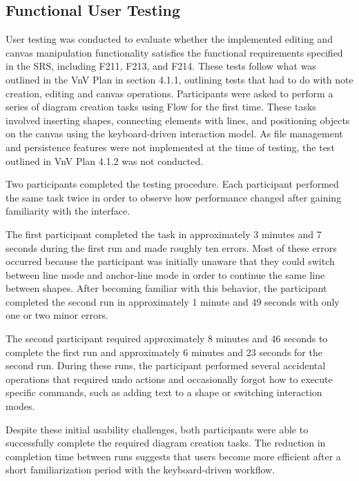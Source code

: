 \documentclass[12pt, titlepage]{article}
\begin{document}
\subsection{Functional User Testing}
User testing was conducted to evaluate whether the implemented editing and
canvas manipulation functionality satisfies the functional requirements
specified in the SRS, including F211, F213, and F214. These tests follow 
what was outlined in the VnV Plan 
in section 4.1.1, outlining tests that had to do with note creation, editing
and canvas operations. Participants were asked to perform a series of diagram
creation tasks using Flow for the first time. These tasks involved inserting
shapes, connecting elements with lines, and positioning objects on the
canvas using the keyboard-driven interaction model. As file management and
persistence features were not implemented at the time of testing, the test 
outlined in VnV Plan 4.1.2 was not conducted. 

\vspace{1em}

Two participants completed the testing procedure. Each participant performed
the same task twice in order to observe how performance changed after gaining
familiarity with the interface.

\vspace{1em}

The first participant completed the task in approximately 3 minutes and
7 seconds during the first run and made roughly ten errors. Most of these
errors occurred because the participant was initially unaware that they could
switch between line mode and anchor-line mode in order to continue the same
line between shapes. After becoming familiar with this behavior, the
participant completed the second run in approximately 1 minute and 49 seconds
with only one or two minor errors.

\vspace{1em}

The second participant required approximately 8 minutes and 46 seconds to
complete the first run and approximately 6 minutes and 23 seconds for the
second run. During these runs, the participant performed several accidental
operations that required undo actions and occasionally forgot how to execute
specific commands, such as adding text to a shape or switching interaction
modes.

\vspace{1em}

Despite these initial usability challenges, both participants were able to
successfully complete the required diagram creation tasks. The reduction in
completion time between runs suggests that users become more efficient after
a short familiarization period with the keyboard-driven workflow.
\end{document}
